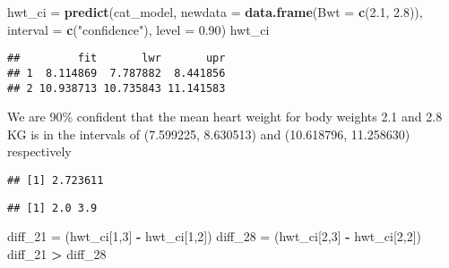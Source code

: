 \documentclass[
]{article}
\newenvironment{Shaded}{\begin{snugshade}}{\end{snugshade}}
\newcommand{\DataTypeTok}[1]{\textcolor[rgb]{0.13,0.29,0.53}{#1}}
\newcommand{\DecValTok}[1]{\textcolor[rgb]{0.00,0.00,0.81}{#1}}
\newcommand{\FloatTok}[1]{\textcolor[rgb]{0.00,0.00,0.81}{#1}}
\newcommand{\KeywordTok}[1]{\textcolor[rgb]{0.13,0.29,0.53}{\textbf{#1}}}
\newcommand{\NormalTok}[1]{#1}
\newcommand{\OperatorTok}[1]{\textcolor[rgb]{0.81,0.36,0.00}{\textbf{#1}}}
\newcommand{\StringTok}[1]{\textcolor[rgb]{0.31,0.60,0.02}{#1}}
\begin{document}
\begin{Shaded}
\begin{Highlighting}[]
\NormalTok{hwt_ci =}\StringTok{ }\KeywordTok{predict}\NormalTok{(cat_model, }\DataTypeTok{newdata =} \KeywordTok{data.frame}\NormalTok{(}\DataTypeTok{Bwt =} \KeywordTok{c}\NormalTok{(}\FloatTok{2.1}\NormalTok{, }\FloatTok{2.8}\NormalTok{)), }\DataTypeTok{interval =} \KeywordTok{c}\NormalTok{(}\StringTok{"confidence"}\NormalTok{), }\DataTypeTok{level =} \FloatTok{0.90}\NormalTok{)}
\NormalTok{hwt_ci}
\end{Highlighting}
\end{Shaded}

\begin{verbatim}
##         fit       lwr       upr
## 1  8.114869  7.787882  8.441856
## 2 10.938713 10.735843 11.141583
\end{verbatim}

We are 90\% confident that the mean heart weight for body weights 2.1
and 2.8 KG is in the intervals of (7.599225, 8.630513) and (10.618796,
11.258630) respectively

\begin{Shaded}
\end{Shaded}

\begin{verbatim}
## [1] 2.723611
\end{verbatim}

\begin{Shaded}
\end{Shaded}

\begin{verbatim}
## [1] 2.0 3.9
\end{verbatim}

\begin{Shaded}
\begin{Highlighting}[]
\NormalTok{diff_}\DecValTok{21}\NormalTok{ =}\StringTok{ }\NormalTok{(hwt_ci[}\DecValTok{1}\NormalTok{,}\DecValTok{3}\NormalTok{] }\OperatorTok{-}\StringTok{ }\NormalTok{hwt_ci[}\DecValTok{1}\NormalTok{,}\DecValTok{2}\NormalTok{])}
\NormalTok{diff_}\DecValTok{28}\NormalTok{ =}\StringTok{ }\NormalTok{(hwt_ci[}\DecValTok{2}\NormalTok{,}\DecValTok{3}\NormalTok{] }\OperatorTok{-}\StringTok{ }\NormalTok{hwt_ci[}\DecValTok{2}\NormalTok{,}\DecValTok{2}\NormalTok{])}
\NormalTok{diff_}\DecValTok{21} \OperatorTok{>}\StringTok{ }\NormalTok{diff_}\DecValTok{28}
\end{Highlighting}
\end{Shaded}
\end{document}

